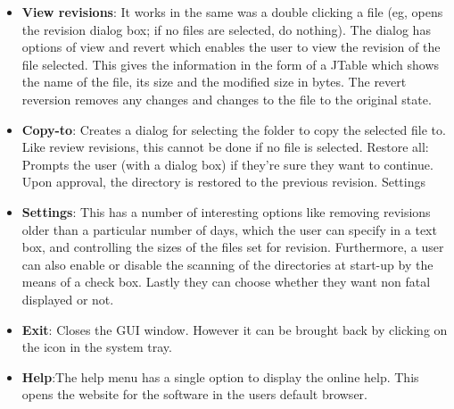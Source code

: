 \documentclass[12pt,a4paper]{article}
\begin{document}
\begin{itemize}
\item \textbf{View revisions}: It works in the same was a double clicking a file (eg, opens the revision dialog box; if no files are selected, do nothing). The dialog has options of view and revert which enables the user to view the revision of the file selected. This gives the information in the form of a JTable which shows the name of the file, its size and the modified size in bytes. The revert reversion removes any changes and changes to the file to the original state.
\item \textbf{Copy-to}: Creates a dialog for selecting the folder to copy the selected file to. Like review revisions, this cannot be done if no file is selected. 
Restore all: Prompts the user (with a dialog box) if they're sure they want to continue. Upon approval, the directory is restored to the previous revision. 
Settings\item \textbf{Settings}: This has a number of interesting options like removing revisions older than a particular number of days, which the user can specify in a text box, and controlling the sizes of the files set for revision.  Furthermore, a user can also enable or disable the scanning of the directories at start-up by the means of a check box. Lastly they can choose whether they want non fatal displayed or not.
\item \textbf{Exit}: Closes the GUI window. However it can be brought back by clicking on the icon in the system tray. 
\item \textbf{Help}:The help menu has a single option to display the online help. This opens the website for the software in the users default browser. 
\end{itemize}
\end{document}
